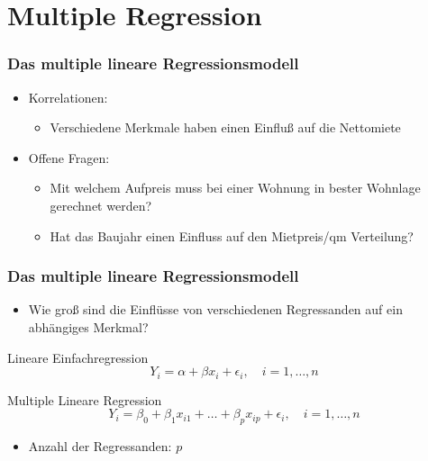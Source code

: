\documentclass{beamer}
\begin{document}
\section{Multiple Regression}
\begin{frame}
 \frametitle{Das multiple lineare Regressionsmodell}
 \begin{itemize}
 \item Korrelationen:
   \begin{itemize}
   \item Verschiedene Merkmale haben einen Einfluß auf die Nettomiete
   \end{itemize}
 \item Offene Fragen:
   \begin{itemize}
   \item Mit welchem Aufpreis muss bei einer Wohnung in bester Wohnlage gerechnet werden?
   \item Hat das Baujahr einen Einfluss auf den Mietpreis/qm Verteilung?
   \end{itemize}
 \end{itemize}

 
\end{frame}



\begin{frame}
 \frametitle{Das multiple lineare Regressionsmodell}

 \begin{itemize}
  \item Wie groß sind die Einflüsse von verschiedenen Regressanden auf ein abhängiges Merkmal?
 \end{itemize}
 
 \begin{block}{Lineare Einfachregression}
  \begin{equation*}
   Y_i = \alpha + \beta x_i + \epsilon_i, \quad i = 1, \dots, n
  \end{equation*}
 \end{block}

 \begin{block}{Multiple Lineare Regression}
  \begin{equation*}
   Y_i = \beta_0 + \beta_1 x_{i1} + \dots + \beta_p x_{ip} + \epsilon_i, \quad i = 1, \dots, n
  \end{equation*}
  \begin{itemize}
   \item Anzahl der Regressanden: $p$
  \end{itemize}

 \end{block}

\end{frame}
\end{document}

